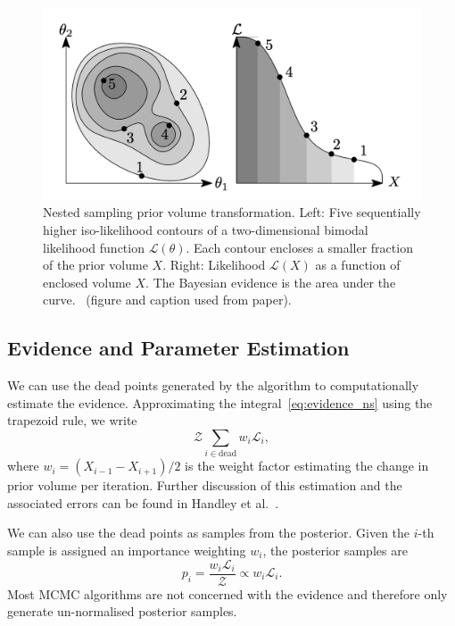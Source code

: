 \documentclass[11pt]{article}
\begin{document}
    \begin{figure}[t!]
        \center
        \includegraphics[width=\linewidth]{../figures/NestedSamplingPolychord}
        \caption{
            Nested sampling prior volume transformation. Left: Five sequentially higher iso-likelihood contours of a
            two-dimensional bimodal likelihood function $\mathcal{L}(\theta)$. Each contour encloses a smaller fraction
            of the prior volume $X$. Right: Likelihood $\mathcal{L}(X)$ as a function of enclosed volume $X$. The
            Bayesian evidence is the area under the curve.~\cite{Handley_polychord, Handley_2015}
            (figure and caption used from paper).
        }\label{fig:nested_sampling}
    \end{figure}


    \subsection{Evidence and Parameter Estimation}\label{subsec:evidence_param_estimation}
    We can use the dead points generated by the algorithm to computationally estimate the evidence.
    Approximating the integral~\eqref{eq:evidence_ns} using the trapezoid rule, we write
    \begin{equation}\label{eq:evidence_estimation}
    \mathcal{Z} \sum_{i \in \text{dead}} w_i \mathcal{L}_i,
    \end{equation}
    where $w_i = (X_{i-1} - X_{i+1})/2$ is the weight factor estimating the change in prior volume per iteration.
    Further discussion of this estimation and the associated errors can be found in
    Handley et al.~\cite{Handley_2015, NS_Review_2022}.

    We can also use the dead points as samples from the posterior.
    Given the $i$-th sample is assigned an importance weighting $w_i$, the posterior samples are
    \begin{equation}\label{eq:posterior_ns}
    p_i = \frac{w_i \mathcal{L}_i}{\mathcal{Z}} \propto w_i \mathcal{L}_i.
    \end{equation}
    Most MCMC algorithms are not concerned with the evidence and therefore only generate un-normalised posterior samples.
\end{document}
